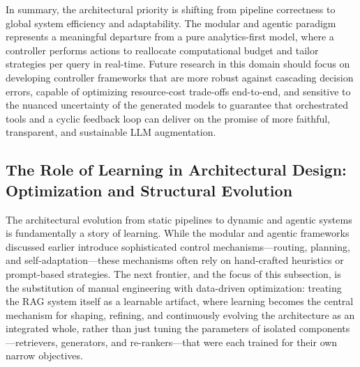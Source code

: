 \documentclass[11pt,a4paper]{article}
\begin{document}
In summary, the architectural priority is shifting from pipeline correctness to global system efficiency and adaptability. The modular and agentic paradigm represents a meaningful departure from a pure analytics-first model, where a controller performs actions to reallocate computational budget and tailor strategies per query in real-time. Future research in this domain should focus on developing controller frameworks that are more robust against cascading decision errors, capable of optimizing resource-cost trade-offs end-to-end, and sensitive to the nuanced uncertainty of the generated models to guarantee that orchestrated tools and a cyclic feedback loop can deliver on the promise of more faithful, transparent, and sustainable LLM augmentation.


\subsection{The Role of Learning in Architectural Design: Optimization and Structural Evolution}


The architectural evolution from static pipelines to dynamic and agentic systems is fundamentally a story of learning. While the modular and agentic frameworks discussed earlier introduce sophisticated control mechanisms---routing, planning, and self-adaptation---these mechanisms often rely on hand-crafted heuristics or prompt-based strategies. The next frontier, and the focus of this subsection, is the substitution of manual engineering with data-driven optimization: treating the RAG system itself as a learnable artifact, where learning becomes the central mechanism for shaping, refining, and continuously evolving the architecture as an integrated whole, rather than just tuning the parameters of isolated components---retrievers, generators, and re-rankers---that were each trained for their own narrow objectives.
\end{document}
